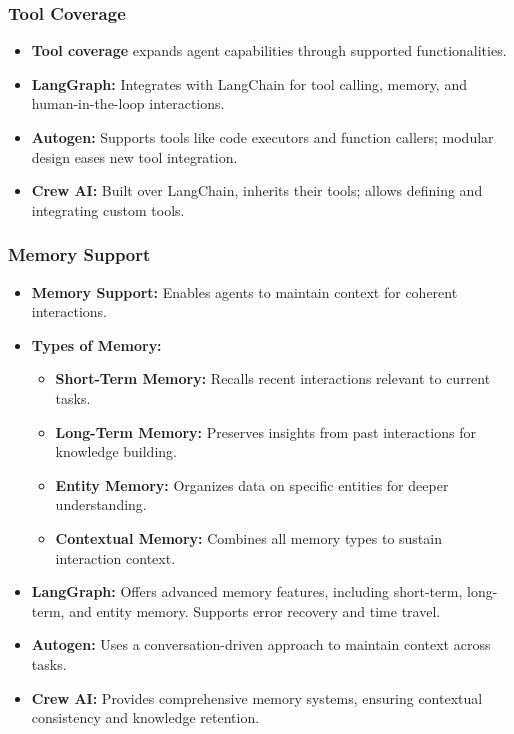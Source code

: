 \begin{frame}[fragile]\frametitle{Tool Coverage}
\begin{itemize}
    \item \textbf{Tool coverage} expands agent capabilities through supported functionalities.
    \item \textbf{LangGraph:} Integrates with LangChain for tool calling, memory, and human-in-the-loop interactions.
    \item \textbf{Autogen:} Supports tools like code executors and function callers; modular design eases new tool integration.
    \item \textbf{Crew AI:} Built over LangChain, inherits their tools; allows defining and integrating custom tools.
\end{itemize}
\end{frame}

\begin{frame}[fragile]\frametitle{Memory Support}
\begin{itemize}
    \item \textbf{Memory Support:} Enables agents to maintain context for coherent interactions.
    \item \textbf{Types of Memory:}
    \begin{itemize}
        \item \textbf{Short-Term Memory:} Recalls recent interactions relevant to current tasks.
        \item \textbf{Long-Term Memory:} Preserves insights from past interactions for knowledge building.
        \item \textbf{Entity Memory:} Organizes data on specific entities for deeper understanding.
        \item \textbf{Contextual Memory:} Combines all memory types to sustain interaction context.
    \end{itemize}
    \item \textbf{LangGraph:} Offers advanced memory features, including short-term, long-term, and entity memory. Supports error recovery and time travel.
    \item \textbf{Autogen:} Uses a conversation-driven approach to maintain context across tasks.
    \item \textbf{Crew AI:} Provides comprehensive memory systems, ensuring contextual consistency and knowledge retention.
\end{itemize}
\end{frame}

